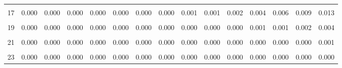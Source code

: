 \documentclass[
]{article}
\begin{document}
\begin{table}[!h]
{\begin{tabular}[t]{ccccccccccccccc}
\cellcolor{gray!10}{16} & \cellcolor{gray!10}{0.000} & \cellcolor{gray!10}{0.000} & \cellcolor{gray!10}{0.000} & \cellcolor{gray!10}{0.000} & \cellcolor{gray!10}{0.000} & \cellcolor{gray!10}{0.000} & \cellcolor{gray!10}{0.001} & \cellcolor{gray!10}{0.001} & \cellcolor{gray!10}{0.003} & \cellcolor{gray!10}{0.005} & \cellcolor{gray!10}{0.007} & \cellcolor{gray!10}{0.011} & \cellcolor{gray!10}{0.016} & \cellcolor{gray!10}{0.022}\\
17 & 0.000 & 0.000 & 0.000 & 0.000 & 0.000 & 0.000 & 0.000 & 0.001 & 0.001 & 0.002 & 0.004 & 0.006 & 0.009 & 0.013\\
\cellcolor{gray!10}{18} & \cellcolor{gray!10}{0.000} & \cellcolor{gray!10}{0.000} & \cellcolor{gray!10}{0.000} & \cellcolor{gray!10}{0.000} & \cellcolor{gray!10}{0.000} & \cellcolor{gray!10}{0.000} & \cellcolor{gray!10}{0.000} & \cellcolor{gray!10}{0.000} & \cellcolor{gray!10}{0.000} & \cellcolor{gray!10}{0.001} & \cellcolor{gray!10}{0.002} & \cellcolor{gray!10}{0.003} & \cellcolor{gray!10}{0.005} & \cellcolor{gray!10}{0.007}\\
19 & 0.000 & 0.000 & 0.000 & 0.000 & 0.000 & 0.000 & 0.000 & 0.000 & 0.000 & 0.000 & 0.001 & 0.001 & 0.002 & 0.004\\
\addlinespace
\cellcolor{gray!10}{20} & \cellcolor{gray!10}{0.000} & \cellcolor{gray!10}{0.000} & \cellcolor{gray!10}{0.000} & \cellcolor{gray!10}{0.000} & \cellcolor{gray!10}{0.000} & \cellcolor{gray!10}{0.000} & \cellcolor{gray!10}{0.000} & \cellcolor{gray!10}{0.000} & \cellcolor{gray!10}{0.000} & \cellcolor{gray!10}{0.000} & \cellcolor{gray!10}{0.000} & \cellcolor{gray!10}{0.001} & \cellcolor{gray!10}{0.001} & \cellcolor{gray!10}{0.002}\\
21 & 0.000 & 0.000 & 0.000 & 0.000 & 0.000 & 0.000 & 0.000 & 0.000 & 0.000 & 0.000 & 0.000 & 0.000 & 0.000 & 0.001\\
\cellcolor{gray!10}{22} & \cellcolor{gray!10}{0.000} & \cellcolor{gray!10}{0.000} & \cellcolor{gray!10}{0.000} & \cellcolor{gray!10}{0.000} & \cellcolor{gray!10}{0.000} & \cellcolor{gray!10}{0.000} & \cellcolor{gray!10}{0.000} & \cellcolor{gray!10}{0.000} & \cellcolor{gray!10}{0.000} & \cellcolor{gray!10}{0.000} & \cellcolor{gray!10}{0.000} & \cellcolor{gray!10}{0.000} & \cellcolor{gray!10}{0.000} & \cellcolor{gray!10}{0.000}\\
23 & 0.000 & 0.000 & 0.000 & 0.000 & 0.000 & 0.000 & 0.000 & 0.000 & 0.000 & 0.000 & 0.000 & 0.000 & 0.000 & 0.000\\
\bottomrule
\end{tabular}}
\end{table}
\end{document}
